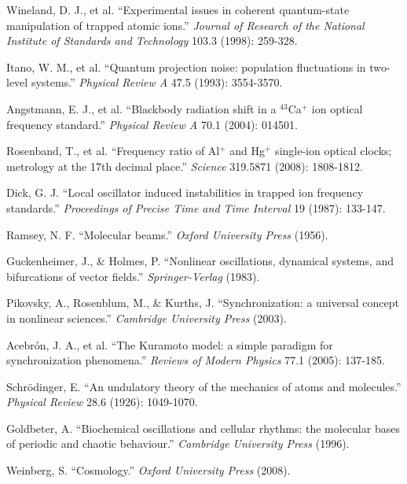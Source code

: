 \documentclass[11pt]{article}
\theoremstyle{remark}
\begin{document}
\begin{thebibliography}{99}
Wineland, D. J., et al. ``Experimental issues in coherent quantum-state manipulation of trapped atomic ions.'' \textit{Journal of Research of the National Institute of Standards and Technology} 103.3 (1998): 259-328.

Itano, W. M., et al. ``Quantum projection noise: population fluctuations in two-level systems.'' \textit{Physical Review A} 47.5 (1993): 3554-3570.

Angstmann, E. J., et al. ``Blackbody radiation shift in a $^{43}$Ca$^+$ ion optical frequency standard.'' \textit{Physical Review A} 70.1 (2004): 014501.

Rosenband, T., et al. ``Frequency ratio of Al$^+$ and Hg$^+$ single-ion optical clocks; metrology at the 17th decimal place.'' \textit{Science} 319.5871 (2008): 1808-1812.

Dick, G. J. ``Local oscillator induced instabilities in trapped ion frequency standards.'' \textit{Proceedings of Precise Time and Time Interval} 19 (1987): 133-147.

Ramsey, N. F. ``Molecular beams.'' \textit{Oxford University Press} (1956).

Guckenheimer, J., \& Holmes, P. ``Nonlinear oscillations, dynamical systems, and bifurcations of vector fields.'' \textit{Springer-Verlag} (1983).

Pikovsky, A., Rosenblum, M., \& Kurths, J. ``Synchronization: a universal concept in nonlinear sciences.'' \textit{Cambridge University Press} (2003).

Acebrón, J. A., et al. ``The Kuramoto model: a simple paradigm for synchronization phenomena.'' \textit{Reviews of Modern Physics} 77.1 (2005): 137-185.

Schrödinger, E. ``An undulatory theory of the mechanics of atoms and molecules.'' \textit{Physical Review} 28.6 (1926): 1049-1070.

Goldbeter, A. ``Biochemical oscillations and cellular rhythms: the molecular bases of periodic and chaotic behaviour.'' \textit{Cambridge University Press} (1996).

Weinberg, S. ``Cosmology.'' \textit{Oxford University Press} (2008).


\end{thebibliography}
\end{document}
